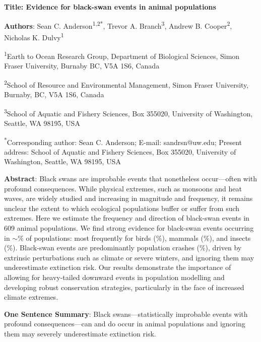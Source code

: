 \textbf{Title: Evidence for black-swan events in animal populations}

\textbf{Authors}: Sean C. Anderson\textsuperscript{1,2*}, Trevor A. Branch\textsuperscript{3}, Andrew B. Cooper\textsuperscript{2}, Nicholas K. Dulvy\textsuperscript{1}

\textsuperscript{1}Earth to Ocean Research Group, Department of Biological Sciences, Simon Fraser University, Burnaby BC, V5A 1S6, Canada

\textsuperscript{2}School of Resource and Environmental Management, Simon Fraser University, Burnaby, BC, V5A 1S6, Canada

\textsuperscript{3}School of Aquatic and Fishery Sciences, Box 355020, University of Washington, Seattle, WA 98195, USA

\textsuperscript{*}Corresponding author: Sean C. Anderson; E-mail: sandrsn@uw.edu; Present address: School of Aquatic and Fishery Sciences, Box 355020, University of Washington, Seattle, WA 98195, USA


\textbf{Abstract}:
Black swans are improbable events that nonetheless occur---often with profound
consequences. While physical extremes, such as monsoons and heat waves, are
widely studied and increasing in magnitude and frequency, it remains unclear
the extent to which ecological populations buffer or suffer from such
extremes. Here we estimate the frequency and direction of black-swan events in
609 animal populations. We find strong evidence for black-swan events
occurring in \(\sim\)\overallBasePerc \% of populations: most frequently for
birds (\birdPH \%), mammals (\mammalsPH \%), and insects (\insectsPH \%).
Black-swan events are predominantly population crashes (\percBSDown \%),
driven by extrinsic perturbations such as climate or severe winters, and
ignoring them may underestimate extinction risk. Our results demonstrate the
importance of allowing for heavy-tailed downward events in population
modelling and developing robust conservation strategies, particularly in the
face of increased climate extremes.

\textbf{One Sentence Summary}: Black swans---statistically improbable events
with profound consequences---can and do occur in animal populations and
ignoring them may severely underestimate extinction risk.



